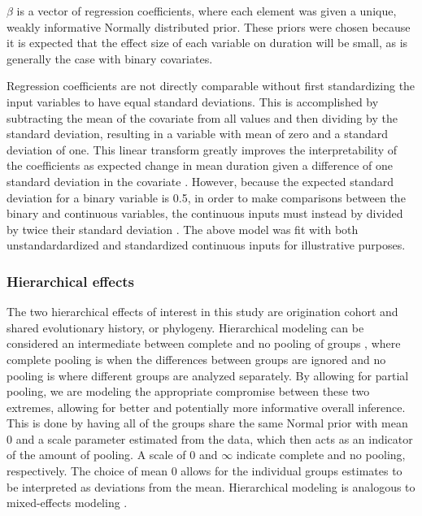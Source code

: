 \documentclass[12pt,letterpaper]{article}
\begin{document}
\(\beta\) is a vector of regression coefficients, where each element was given a unique, weakly informative Normally distributed prior. These priors were chosen because it is expected that the effect size of each variable on duration will be small, as is generally the case with binary covariates. %

Regression coefficients are not directly comparable without first standardizing the input variables to have equal standard deviations. This is accomplished by subtracting the mean of the covariate from all values and then dividing by the standard deviation, resulting in a variable with mean of zero and a standard deviation of one. This linear transform greatly improves the interpretability of the coefficients as expected change in mean duration given a difference of one standard deviation in the covariate \citep{Schielzeth2010}. However, because the expected standard deviation for a binary variable is 0.5, in order to make comparisons between the binary and continuous variables, the continuous inputs must instead by divided by twice their standard deviation \citep{Gelman2008}. The above model was fit with both unstandardardized and standardized continuous inputs for illustrative purposes.


\subsubsection{Hierarchical effects}

The two hierarchical effects of interest in this study are origination cohort and shared evolutionary history, or phylogeny. Hierarchical modeling can be considered an intermediate between complete and no pooling of groups \citep{Gelman2007}, where complete pooling is when the differences between groups are ignored and no pooling is where different groups are analyzed separately. By allowing for partial pooling, we are modeling the appropriate compromise between these two extremes, allowing for better and potentially more informative overall inference. This is done by having all of the groups share the same Normal prior with mean 0 and a scale parameter estimated from the data, which then acts as an indicator of the amount of pooling. A scale of 0 and \(\infty\) indicate complete and no pooling, respectively. The choice of mean 0 allows for the individual groups estimates to be interpreted as deviations from the mean. Hierarchical modeling is analogous to mixed-effects modeling \citep{Gelman2007}.
\end{document}
